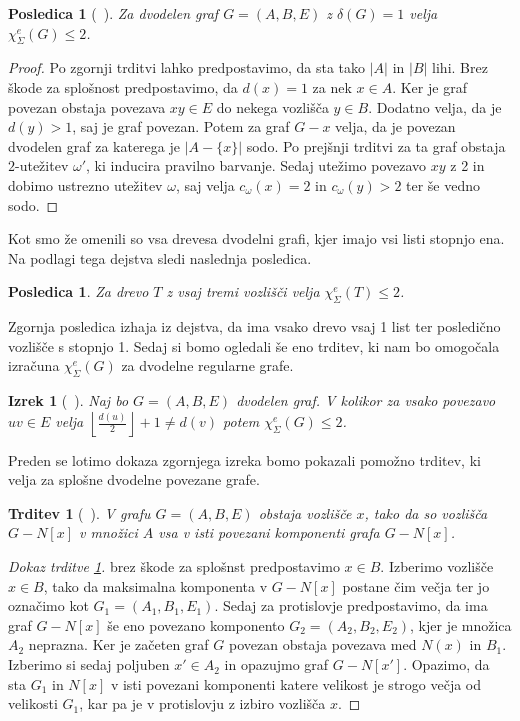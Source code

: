 \documentclass[12pt,a4paper,twoside]{article}
\theoremstyle{definition} %
\theoremstyle{plain} %
\newtheorem{izrek}[definicija]{Izrek}
\newtheorem{trditev}[definicija]{Trditev}
\newtheorem{posledica}[definicija]{Posledica}
\newcommand{\ec}{\chi_{\Sigma}^e}
\numberwithin{equation}{section}  %
\begin{document}
\begin{posledica}[~\citet{examples}]
Za dvodelen graf $G = (A, B, E)$ z $\delta(G)=1$ velja $\ec(G)  \le 2$.
\end{posledica}
\begin{proof}
Po zgornji trditvi lahko predpostavimo, da sta tako $|A|$ in $|B|$ lihi. Brez škode za splošnost predpostavimo, da $d(x) = 1$ za nek $x \in A$. Ker je graf povezan obstaja povezava $xy \in E$ do nekega vozlišča $y \in B$. Dodatno velja, da je $d(y) > 1$, saj je graf povezan. Potem za graf $G - x$ velja, da je povezan dvodelen graf  za katerega je $|A -  \{x\}|$ sodo. Po prejšnji trditvi za ta graf obstaja $2$-utežitev $\omega'$, ki inducira pravilno barvanje. Sedaj utežimo povezavo $xy$ z 2 in dobimo ustrezno utežitev $\omega$, saj velja $c_{\omega}(x) = 2$ in $c_{\omega}(y) > 2$ ter še vedno sodo.
\end{proof}
Kot smo že omenili so vsa drevesa dvodelni grafi, kjer imajo vsi listi stopnjo ena. Na podlagi tega dejstva sledi naslednja posledica.
\begin{posledica}
Za drevo $T$ z vsaj tremi vozlišči velja $\ec(T) \le 2$.
\end{posledica}
Zgornja posledica izhaja iz dejstva, da ima vsako drevo vsaj 1 list ter posledično vozlišče s stopnjo 1. Sedaj si bomo ogledali še eno trditev, ki nam bo omogočala izračuna $\ec(G)$ za dvodelne regularne grafe.
\begin{izrek}[~\citet{examples}]
\label{dvoreg}
Naj bo $G = (A,B, E)$ dvodelen graf. V kolikor za vsako povezavo $uv \in E$ velja $\left \lfloor \frac{d(u)}{2} \right \rfloor + 1 \neq d(v) $ potem $\ec(G) \le 2$.
\end{izrek}
Preden se lotimo dokaza zgornjega izreka bomo pokazali pomožno trditev, ki velja za splošne dvodelne povezane grafe.
\begin{trditev}[~\citet{examples}]
\label{t1}
V grafu $G = (A, B, E)$ obstaja vozlišče $x$, tako da so vozlišča $G - N[x]$ v množici $A$ vsa v isti povezani komponenti grafa $G -  N[x]$.
\end{trditev}

\begin{proof}[Dokaz trditve \ref{t1}]
brez škode za splošnst predpostavimo $x \in B$. Izberimo vozlišče $x \in B$, tako da  maksimalna komponenta v $G - N[x]$ postane čim večja ter jo označimo kot $G_1 = (A_1, B_1, E_1)$. Sedaj za protislovje predpostavimo, da ima graf  $G - N[x]$ še eno povezano komponento $G_2 = (A_2, B_2, E_2)$, kjer je množica $A_2$ neprazna. Ker je začeten graf $G$ povezan obstaja povezava med $N(x)$ in $B_1$.  Izberimo si sedaj poljuben $x' \in A_2$ in opazujmo graf $G - N[x']$. Opazimo, da sta $G_1$ in $N[x]$ v isti povezani komponenti katere velikost je strogo večja od velikosti $G_1$, kar pa je v protislovju z izbiro vozlišča $x$.
\end{proof}
\end{document}
